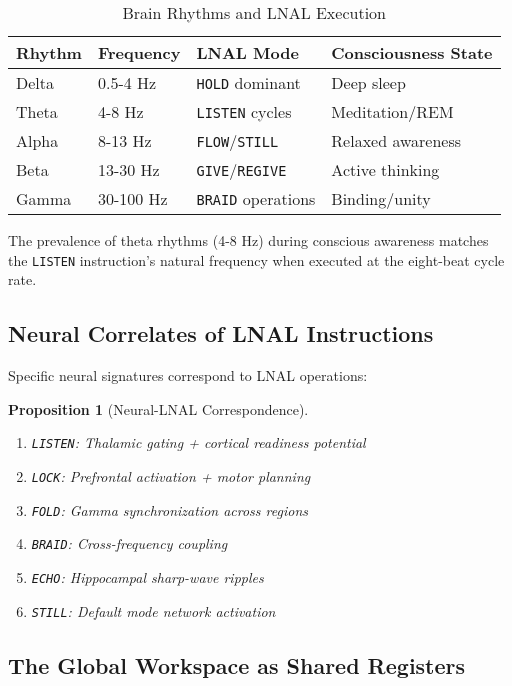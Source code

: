 \documentclass[12pt,a4paper]{article}
\newtheorem{proposition}[theorem]{Proposition}
\newcommand{\opcmd}[1]{\texttt{#1}}
\begin{document}
\begin{table}[H]
\centering
\caption{Brain Rhythms and LNAL Execution}
\begin{tabular}{llll}
\toprule
\textbf{Rhythm} & \textbf{Frequency} & \textbf{LNAL Mode} & \textbf{Consciousness State} \\
\midrule
Delta & 0.5-4 Hz & \opcmd{HOLD} dominant & Deep sleep \\
Theta & 4-8 Hz & \opcmd{LISTEN} cycles & Meditation/REM \\
Alpha & 8-13 Hz & \opcmd{FLOW}/\opcmd{STILL} & Relaxed awareness \\
Beta & 13-30 Hz & \opcmd{GIVE}/\opcmd{REGIVE} & Active thinking \\
Gamma & 30-100 Hz & \opcmd{BRAID} operations & Binding/unity \\
\bottomrule
\end{tabular}
\end{table}

The prevalence of theta rhythms (4-8 Hz) during conscious awareness matches the \opcmd{LISTEN} instruction's natural frequency when executed at the eight-beat cycle rate.

\subsection{Neural Correlates of LNAL Instructions}

Specific neural signatures correspond to LNAL operations:

\begin{proposition}[Neural-LNAL Correspondence]
\begin{enumerate}
\item \opcmd{LISTEN}: Thalamic gating + cortical readiness potential
\item \opcmd{LOCK}: Prefrontal activation + motor planning
\item \opcmd{FOLD}: Gamma synchronization across regions
\item \opcmd{BRAID}: Cross-frequency coupling
\item \opcmd{ECHO}: Hippocampal sharp-wave ripples
\item \opcmd{STILL}: Default mode network activation
\end{enumerate}
\end{proposition}

\subsection{The Global Workspace as Shared Registers}
\end{document}
